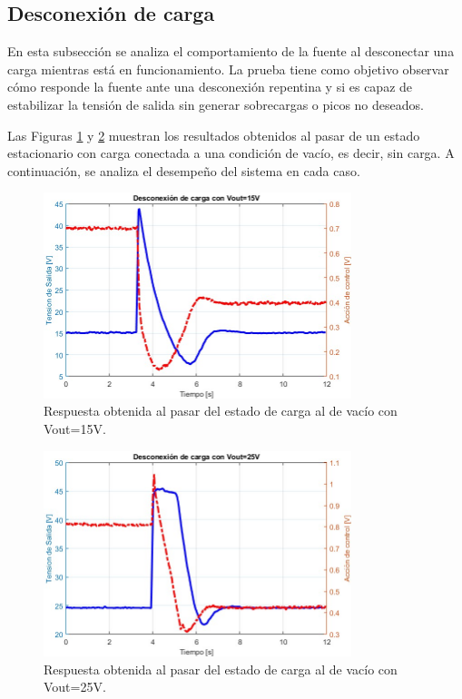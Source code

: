 \subsection{Desconexión de carga}
En esta subsección se analiza el comportamiento de la fuente al desconectar una carga mientras está en funcionamiento. La prueba tiene como objetivo observar cómo responde la fuente ante una desconexión repentina y si es capaz de estabilizar la tensión de salida sin generar sobrecargas o picos no deseados.\par
Las Figuras \ref{F:Desconexion15} y \ref{F:Desconexion25} muestran los resultados obtenidos al pasar de un estado estacionario con carga conectada a una condición de vacío, es decir, sin carga. A continuación, se analiza el desempeño del sistema en cada caso.\par 
\begin{figure}[htbp]
    \centering
    \includegraphics[width=0.8\textwidth]{./imagenes/Desconexion1.jpg}
    \caption{Respuesta obtenida al pasar del estado de carga al de vacío con Vout=15V.}
    \label{F:Desconexion15}
\end{figure}\par 
\begin{figure}[htbp]
    \centering
    \includegraphics[width=0.8\textwidth]{./imagenes/Desconexion2.jpg}
    \caption{Respuesta obtenida al pasar del estado de carga al de vacío con Vout=25V.}
    \label{F:Desconexion25}
\end{figure}\par 
